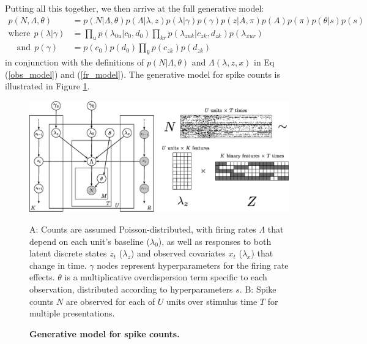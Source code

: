 \documentclass[10pt,letterpaper]{article}
\newcommand{\added}[1]{\textcolor{added}{#1}}
\begin{document}
Putting all this together, we then arrive at the full generative model:
\begin{align}
    p(N, \Lambda, \theta) &= p(N| \Lambda, \theta)p(\Lambda|\lambda, z)
    p(\lambda|\gamma) p(\gamma)
    p(z|A, \pi)
    p(A)p(\pi)p(\theta|s)p(s) \\
    \text{where} ~~ p(\lambda|\gamma) &= \prod_u p(\lambda_{0u}|c_0, d_0)\prod_{kr} p(\lambda_{zuk}|c_{zk}, d_{zk}) p(\lambda_{xur}) \\
    \text{~~ and} ~~ p(\gamma) &= p(c_0)p(d_0)\prod_k p(c_{zk}) p(d_{zk})
\end{align}
in conjunction with the definitions of $p(N|\Lambda, \theta)$ and $\Lambda(\lambda, z, x)$ in Eq (\ref{obs_model}) and (\ref{fr_model}). The generative model for spike counts is illustrated in Figure \ref{model}.

\begin{figure}[!h]
    \includegraphics[width=\linewidth]{model}
	\caption{\bf Generative model for spike counts.}
	A: Counts are assumed Poisson-distributed, with firing rates $\Lambda$ that depend on each unit's \added{baseline ($\lambda_0$), as well as responses} to both latent discrete states $z_t$ \added{($\lambda_z$)} and observed covariates $x_t$ \added{($\lambda_x$)} that change in time. $\gamma$ nodes represent hyperparameters for the firing rate effects. $\theta$ is a multiplicative overdispersion term specific to each observation, distributed according to hyperparameters $s$. B: Spike counts $N$ are observed for each of $U$ units over stimulus time $T$ for multiple presentations.
\label{model}
\end{figure}
\end{document}
